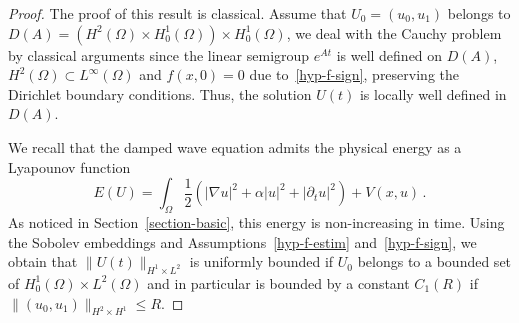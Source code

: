 \documentclass[10pt]{amsart}
\theoremstyle{definition}\newtheorem{defi}[theo]{Definition}\newtheorem{rema}[theo]{Remark}\newtheorem{exam}[theo]{Example}\newtheorem{exem}[theo]{Example}\newtheorem{nota}[theo]{Notation}
\newcommand{\grad}{\nabla}
\begin{document}
\begin{proof}
The proof of this result is classical. Assume that $U_0=(u_0,u_1)$ belongs to $D(A)=(H^2(\Omega)\times H^1_0(\Omega))\times H^1_0(\Omega)$, we deal with the Cauchy problem by classical arguments since the linear semigroup $e^{At}$ is well defined on $D(A)$, $H^2(\Omega)\subset L^\infty(\Omega)$ and $f(x,0)=0$ due to~\eqref{hyp-f-sign}, preserving the Dirichlet boundary conditions. Thus, the solution $U(t)$ is locally well defined in $D(A)$.

We recall that the damped wave equation admits the physical energy as a Lyapounov function
\[
E(U)=\int_\Omega \frac 12\left(|\grad u|^2+\alpha |u|^2 + |\partial_t u|^2\right) +
V(x,u)\,.
\]
As noticed in Section~\ref{section-basic}, this energy is non-increasing in time. Using the Sobolev embeddings and Assumptions~\eqref{hyp-f-estim} and~\eqref{hyp-f-sign}, we obtain that $\|U(t)\|_{H^1\times L^2}$ is uniformly bounded if $U_0$ belongs to a bounded set of $H^1_0(\Omega)\times L^2(\Omega)$ and in particular is bounded by a constant $C_1(R)$ if $\|(u_0,u_1)\|_{H^2\times H^1} \leq R$.


\end{proof}
\end{document}
